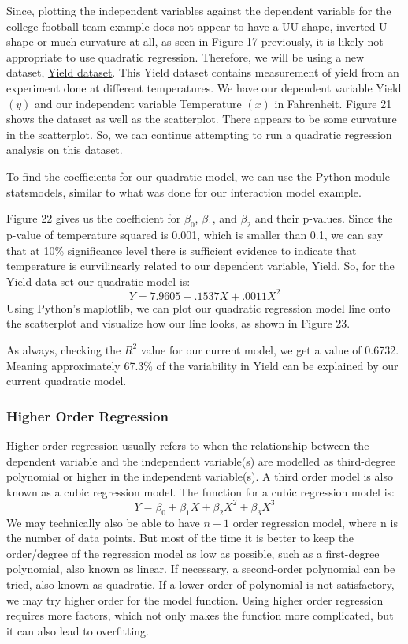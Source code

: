 \documentclass[a4paper,12pt]{report}
\newcommand{\link}[2]{\hyperlink{#1}{\underline{#2}}}
\begin{document}
Since, plotting the independent variables against the dependent variable for the college football team example does not appear to have a UU shape, inverted U shape or much curvature at all, as seen in Figure 17 previously, it is likely not appropriate to use quadratic regression. Therefore, we will be using a new dataset, \link{https://online.stat.psu.edu/stat462/node/159/}{Yield dataset}. This Yield dataset contains measurement of yield from an experiment done at different temperatures. We have our dependent variable Yield $(y)$ and our independent variable Temperature $(x)$ in Fahrenheit. Figure 21 shows the dataset as well as the scatterplot. There appears to be some curvature in the scatterplot. So, we can continue attempting to run a quadratic regression analysis on this dataset.

To find the coefficients for our quadratic model, we can use the Python module statsmodels, similar to what was done for our interaction model example. 

Figure 22 gives us the coefficient for $\beta_0$, $\beta_1$, and $\beta_2$ and their p-values. Since the p-value of temperature squared is 0.001, which is smaller than 0.1, we can say that at 10\% significance level there is sufficient evidence to indicate that temperature is curvilinearly related to our dependent variable, Yield. So, for the Yield data set our quadratic model is:
$$Y=7.9605-.1537X+.0011X^2$$
Using Python’s maplotlib, we can plot our quadratic regression model line onto the scatterplot and visualize how our line looks, as shown in Figure 23. 

As always, checking the $R^2$ value for our current model, we get a value of 0.6732. Meaning approximately 67.3\% of the variability in Yield can be explained by our current quadratic model. 

\subsubsection{Higher Order Regression}
Higher order regression usually refers to when the relationship between the dependent variable and the independent variable(s) are modelled as third-degree polynomial or higher in the independent variable(s). A third order model is also known as a cubic regression model. The function for a cubic regression model is:
$$Y=\beta_0+\beta_1X+\beta_2X^2+\beta_3X^3$$
We may technically also be able to have $n - 1$ order regression model, where n is the number of data points. But most of the time it is better to keep the order/degree of the regression model as low as possible, such as a first-degree polynomial, also known as linear. If necessary, a second-order polynomial can be tried, also known as quadratic. If a lower order of polynomial is not satisfactory, we may try higher order for the model function. Using higher order regression requires more factors, which not only makes the function more complicated, but it can also lead to overfitting.
\end{document}

